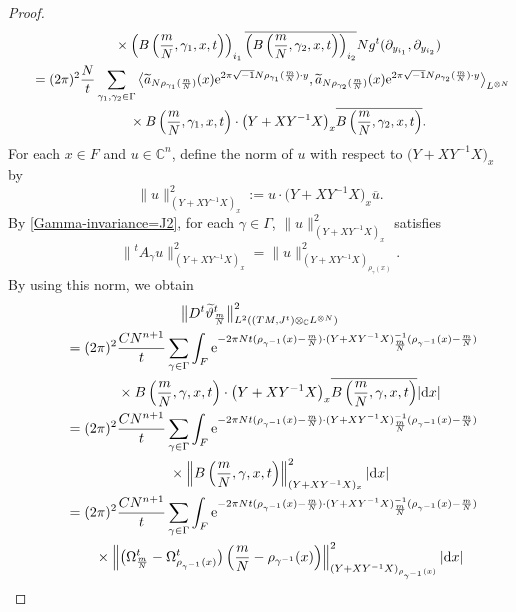 \documentclass[10pt,a4paper]{amsart}
\numberwithin{equation}{section}
\newcommand{\C}{\mathbb{C}}
\renewcommand{\tilde}{\widetilde}
\newcommand{\abs}[1]{\lvert#1\rvert}
\newcommand{\norm}[1]{\lVert#1\rVert}
\begin{document}
\begin{proof}
\begin{gather*}
\phantom{\qquad=}{}\times \left( B\left(\frac{m}{N}, \gamma_1 ,x,t\right)\right)_{i_1}\overline{ \left( B\left(\frac{m}{N}, \gamma_2 ,x,t\right)\right)_{i_2}}Ng^t(\partial_{y_{i_1}}, \partial_{y_{i_2}})\\
\qquad=(2\pi)^2\frac{N}{t}\sum_{\gamma_1, \gamma_2 \in \Gamma}\big\langle {\tilde a}_{N\rho_{\gamma_1}(\frac{m}{N})}(x){\rm e}^{2\pi\sqrt{-1}N\rho_{\gamma_1} (\frac{m}{N})\cdot y}, {\tilde a}_{N\rho_{\gamma_2}(\frac{m}{N})}(x){\rm e}^{2\pi\sqrt{-1}N\rho_{\gamma_2} (\frac{m}{N})\cdot y}\big\rangle_{L^{\otimes N}}\\
\phantom{\qquad=}{} \times B\left(\frac{m}{N}, \gamma_1 ,x,t\right)\cdot \bigl(Y+XY^{-1}X\bigr)_x \overline{ B\left(\frac{m}{N}, \gamma_2 ,x,t\right)}.
\end{gather*}
For each $x\in F$ and $u\in \C^n$, define the norm of $u$ with respect to $\bigl(Y+XY^{-1}X\bigr)_x$ by
\[
\norm{u}^2_{(Y+XY^{-1}X)_x}:=u\cdot \bigl(Y+XY^{-1}X\bigr)_x\overline{u}.
\]
By \eqref{Gamma-invariance=J2}, for each $\gamma \in \Gamma$, $\norm{u}^2_{(Y+XY^{-1}X)_x}$ satisfies
\[
\big\|{}^tA_{\gamma}u\big\|^2_{(Y+XY^{-1}X)_x}=\norm{u}^2_{(Y+XY^{-1}X)_{\rho_\gamma (x)}}.
\]
By using this norm, we obtain
\begin{gather*}%
\big\|D^t {\tilde \vartheta}^t_{\frac{m}{N}}\big\|_{L^2((TM, J^t)\otimes_{\C}L^{\otimes N})}^2 \\
\qquad=(2\pi)^2\frac{C N^{n+1}}{t}\sum_{\gamma \in \Gamma}\int_F {\rm e}^{-2\pi Nt(\rho_{\gamma^{-1}}(x)-\frac{m}{N})\cdot ( Y+XY^{-1}X)^{-1}_{\frac{m}{N}}(\rho_{\gamma^{-1}}(x)-\frac{m}{N})} \\
\phantom{\qquad=}{} \times B\left(\frac{m}{N}, \gamma ,x,t\right)\cdot \bigl(Y+XY^{-1}X\bigr)_x \overline{ B\left(\frac{m}{N}, \gamma ,x,t\right)}\abs{{\rm d}x}\nonumber %
\\
\qquad=(2\pi)^2\frac{C N^{n+1}}{t}\sum_{\gamma \in \Gamma}\int_F {\rm e}^{-2\pi Nt(\rho_{\gamma^{-1}}(x)-\frac{m}{N})\cdot ( Y+XY^{-1}X)^{-1}_{\frac{m}{N}}(\rho_{\gamma^{-1}}(x)-\frac{m}{N})} \\
\phantom{\qquad=}{} \times \left\lVert B\left(\frac{m}{N}, \gamma ,x,t\right)\right\rVert^2_{(Y+XY^{-1}X)_x}\abs{{\rm d}x} \\
\qquad=(2\pi)^2\frac{C N^{n+1}}{t}\sum_{\gamma \in \Gamma}\int_F {\rm e}^{-2\pi Nt(\rho_{\gamma^{-1}}(x)-\frac{m}{N})\cdot ( Y+XY^{-1}X)^{-1}_{\frac{m}{N}}(\rho_{\gamma^{-1}}(x)-\frac{m}{N})} \\
\phantom{\qquad=}{} \times \left\lVert \bigl( \Omega^t_{\frac{m}{N}}-\Omega^t_{\rho_{\gamma^{-1}}(x)}\bigr)\left(\frac{m}{N}-\rho_{\gamma^{-1}}(x)\right)\right\rVert^2_{(Y+XY^{-1}X)_{\rho_{\gamma^{-1}}(x)}}\abs{{\rm d}x} \\

\end{gather*}
\end{proof}
\end{document}
